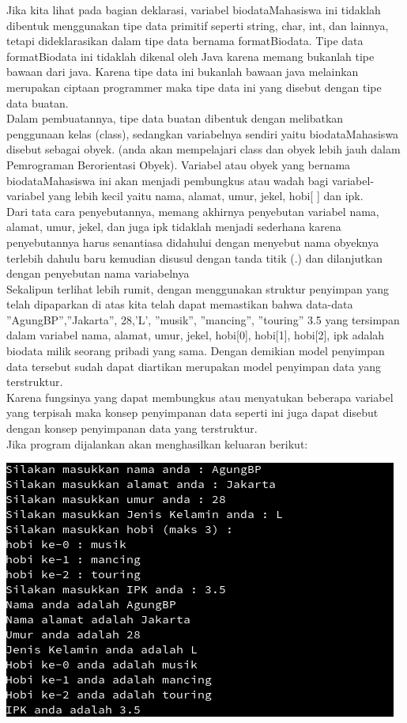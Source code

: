 \documentclass[a4paper,12pt]{article}
\begin{document}
Jika kita  lihat pada bagian deklarasi, variabel biodataMahasiswa ini tidaklah 
dibentuk menggunakan tipe data primitif seperti string, char, int, dan lainnya, tetapi  
dideklarasikan dalam tipe data bernama formatBiodata. Tipe data formatBiodata ini 
tidaklah dikenal oleh Java karena memang bukanlah tipe bawaan dari java. Karena tipe 
data ini bukanlah bawaan java melainkan merupakan ciptaan programmer maka tipe 
data ini yang disebut dengan tipe data buatan. \\
 
Dalam pembuatannya, tipe data buatan dibentuk dengan melibatkan 
penggunaan kelas (class), sedangkan variabelnya sendiri yaitu biodataMahasiswa 
disebut sebagai obyek. (anda akan mempelajari class dan obyek lebih jauh dalam 
Pemrograman Berorientasi Obyek). Variabel atau obyek yang bernama 
biodataMahasiswa ini akan menjadi pembungkus atau wadah bagi variabel-variabel 
yang lebih kecil yaitu nama, alamat, umur, jekel, hobi[ ] dan ipk.\\
Dari tata cara penyebutannya, memang akhirnya penyebutan variabel nama, 
alamat, umur, jekel, dan juga ipk tidaklah menjadi sederhana karena penyebutannya 
harus senantiasa didahului dengan menyebut nama obyeknya terlebih dahulu baru 
kemudian disusul dengan tanda titik (.) dan dilanjutkan dengan penyebutan nama variabelnya\\
Sekalipun terlihat lebih rumit, dengan menggunakan struktur penyimpan yang 
telah dipaparkan di atas kita telah dapat memastikan bahwa data-data 
”AgungBP”,”Jakarta”, 28,’L’, ”musik”, ”mancing”, ”touring” 
3.5  yang tersimpan dalam variabel nama, alamat, umur, jekel, 
hobi[0], hobi[1], hobi[2], ipk adalah biodata milik seorang pribadi yang 
sama. Dengan demikian model penyimpan data tersebut sudah dapat diartikan 
merupakan model penyimpan data yang terstruktur.\\ 
Karena fungsinya yang dapat membungkus atau menyatukan beberapa variabel 
yang terpisah maka konsep penyimpanan data seperti ini juga dapat disebut dengan konsep penyimpanan data yang
terstruktur.\\
Jika program dijalankan akan menghasilkan keluaran berikut:
\begin{center}
    \includegraphics[scale=.7]{prog12.png} 
\end{center}
\end{document}
